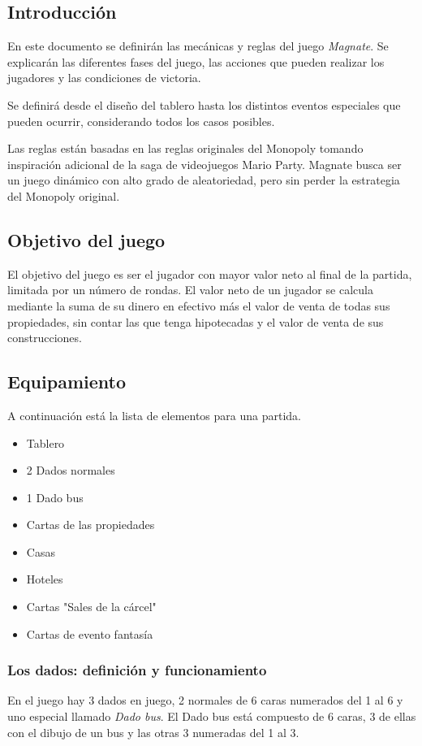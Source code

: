 \subsection{Introducción}
En este documento se definirán las mecánicas y reglas del juego \textit{Magnate}.
Se explicarán las diferentes fases del juego, las acciones que pueden realizar 
los jugadores y las condiciones de victoria. 

Se definirá desde el diseño del tablero hasta los distintos eventos especiales
que pueden ocurrir, considerando todos los casos posibles.

Las reglas están basadas en las reglas originales del Monopoly \cite{hasbro_monopoly_es} 
tomando inspiración adicional de la saga de videojuegos Mario Party.
Magnate busca ser un juego dinámico con alto grado de aleatoriedad, pero
sin perder la estrategia del Monopoly original.

\subsection{Objetivo del juego}
El objetivo del juego es ser el jugador con mayor valor neto al final de la
partida, limitada por un número de rondas. El valor neto de un jugador se calcula
mediante la suma de su dinero en efectivo más el valor de venta
de todas sus propiedades, sin contar las que tenga hipotecadas y
el valor de venta de sus construcciones.



\subsection{Equipamiento}
A continuación está la lista de elementos para una partida.
\begin{itemize}
	\item Tablero
	\item 2 Dados normales
	\item 1 Dado bus 
	\item Cartas de las propiedades 
	\item Casas
	\item Hoteles 
	\item Cartas "Sales de la cárcel"
	\item Cartas de evento fantasía
\end{itemize}

\subsubsection{Los dados: definición y funcionamiento}
En el juego hay 3 dados en juego, 2 normales de 6 caras numerados del 1 al 
6 y uno especial llamado \textit{Dado bus}. El Dado bus está compuesto de 6
caras, 3 de ellas con el dibujo de un bus y las otras 3 numeradas del 1 al 3.

